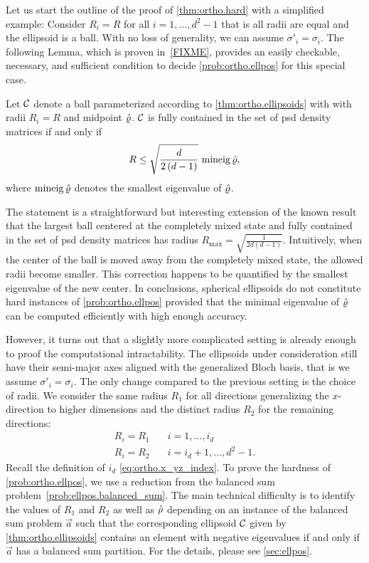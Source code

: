 Let us start the outline of the proof of \cref{thm:ortho.hard} with a simplified example: 
Consider $R_{i}=R$ for all $i=1,\ldots,d^{2}-1$ that is all radii are equal and the ellipsoid is a ball.
With no loss of generality, we can assume $\sigma'_i = \sigma_i$.
The following Lemma, which is proven in~\cref{FIXME}, provides an easily checkable, necessary, and sufficient condition to decide \cref{prob:ortho.ellpos} for this special case.
\begin{lemma}\label{lem:ortho.spheres}
  Let $\mathcal{C}$ denote a ball parameterized according to \cref{thm:ortho.ellipsoids} with with radii $R_i=R$ and midpoint $\hat{\varrho}$.
  $\mathcal{C}$ is fully contained in the set of psd density matrices if and only if
  \[
    R\leq\sqrt{\frac{d}{2\left(d-1\right)}} \, \operatorname{mineig} \hat{\varrho},
  \]
  where $\operatorname{mineig}\hat{\varrho}$ denotes the smallest eigenvalue of $\hat{\varrho}$.
\end{lemma}
The statement is a straightforward but interesting extension of the known result that the largest ball centered at the completely mixed state and fully contained in the set of psd density matrices has radius $R_{\mathrm{max}}=\sqrt{\frac{1}{2d\left(d-1\right)}}$.
Intuitively, when the center of the ball is moved away from the completely mixed state, the allowed radii become smaller.
This correction happens to be quantified by the smallest eigenvalue of the new center.
In conclusions, spherical ellipsoids do not constitute hard instances of \cref{prob:ortho.ellpos} provided that the minimal eigenvalue of $\hat{\varrho}$ can be computed efficiently with high enough accuracy.

However, it turns out that a slightly more complicated setting is already enough to proof the computational intractability.
The ellipsoids under consideration still have their semi-major axes aligned with the generalized Bloch basis, that is we assume $\sigma'_i = \sigma_i$.
The only change compared to the previous setting is the choice of radii.
We consider the same radius $R_{1}$ for all directions generalizing the $x$-direction to higher dimensions and the distinct radius $R_{2}$ for the remaining directions:
\[
  \label{eq:ortho.subclass}
  \begin{split}
    R_{i}=R_{1} &\quad i=1,\ldots,i_{d}\\
    R_{i}=R_{2} &\quad i=i_{d}+1,\ldots,d^{2}-1.
  \end{split}
\]
Recall the definition of $i_d$ \cref{eq:ortho.x_yz_index}.
To prove the hardness of \cref{prob:ortho.ellpos}, we use a reduction from the balanced sum problem~\ref{prob:ellpos.balanced_sum}.
The main technical difficulty is to identify the values of $R_1$ and $R_2$ as well as $\hat{\rho}$ depending on an instance of the balanced sum problem $\vec a$ such that the corresponding ellipsoid $\mathcal{C}$ given by \cref{thm:ortho.ellipsoids} contains an element with negative eigenvalues if and only if $\vec a$ has a balanced sum partition.
For the details, please see \cref{sec:ellpos}.